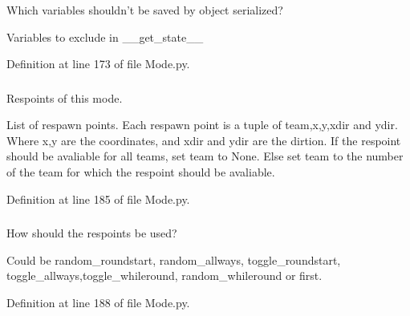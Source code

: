 Which variables shouldn't be saved by object serialized? 

Variables to exclude in \_\-\_\-get\_\-state\_\-\_\- 

Definition at line 173 of file Mode.py.

\hypertarget{class_mode_1_1_mode_a2e07ed5d08d3ced387d24587f8a87967}{
\subsubsection[{\_\-\_\-respoints}]{}}
\label{class_mode_1_1_mode_a2e07ed5d08d3ced387d24587f8a87967}


Respoints of this mode. 

List of respawn points. Each respawn point is a tuple of team,x,y,xdir and ydir. Where x,y are the coordinates, and xdir and ydir are the dirtion. If the respoint should be avaliable for all teams, set team to None. Else set team to the number of the team for which the respoint should be avaliable. 

Definition at line 185 of file Mode.py.

\hypertarget{class_mode_1_1_mode_a1fd32aea9872573e444d08b65ec28ef2}{
\subsubsection[{\_\-\_\-restype}]{}}
\label{class_mode_1_1_mode_a1fd32aea9872573e444d08b65ec28ef2}


How should the respoints be used? 

Could be random\_\-roundstart, random\_\-allways, toggle\_\-roundstart, toggle\_\-allways,toggle\_\-whileround, random\_\-whileround or first. 

Definition at line 188 of file Mode.py.

